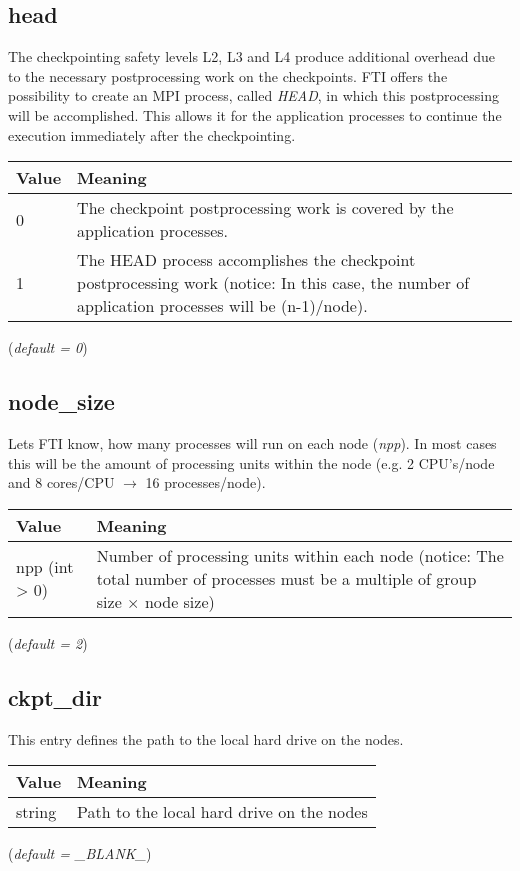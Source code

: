 \documentclass{refrep}
\begin{document}
\subsection{head}\label{subsec:head}
The checkpointing safety levels L2, L3 and L4 produce additional overhead due to the necessary postprocessing work on the checkpoints. FTI offers the possibility to create an MPI process, called \emph{HEAD}, in which this postprocessing will be accomplished. This allows it for the application processes to continue the execution immediately after the checkpointing.
\begin{center}
\begin{tabular}[h!]{|p{}|p{}|}
\hline
\textbf{Value} & \textbf{Meaning} \\ \hline
0 & The checkpoint postprocessing work is covered by the application processes. \\ \hline
1 & The HEAD process accomplishes the checkpoint postprocessing work (notice: In this case, the number of application processes will be (n-1)/node). \\
\hline
\end{tabular}
\end{center}
(\textit{default = 0})
\subsection{node\_size}\label{subsec:nodesize}
Lets FTI know, how many processes will run on each node (\emph{npp}). In most cases this will be the amount of processing units within the node (e.g. 2 CPU's/node and 8 cores/CPU $\rightarrow$ 16 processes/node).
\begin{center}
\begin{tabular}[h!]{|p{}|p{}|}
\hline
\textbf{Value} & \textbf{Meaning} \\ \hline
npp (int > 0) & Number of processing units within each node (notice: The total number of processes must be a multiple of group size $\times$ node size) \\ \hline
\end{tabular}
\end{center}
(\textit{default = 2})
\subsection{ckpt\_dir}\label{subsec:ckptdir}
This entry defines the path to the local hard drive on the nodes.
\begin{center}
\begin{tabular}[h!]{|p{}|p{}|}
\hline
\textbf{Value} & \textbf{Meaning} \\ \hline
string & Path to the local hard drive on the nodes \\ \hline
\end{tabular}
\end{center}
(\textit{default = \_BLANK\_})
\end{document}
